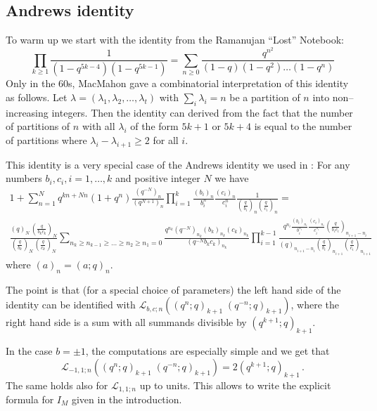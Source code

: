 \documentclass[12pt]{amsart}
\theoremstyle{plain}
\theoremstyle{definition}
\def\cL{\mathcal L}
\begin{document}
\subsection{Andrews identity}
To warm up
we start with the  identity from the Ramanujan ``Lost'' Notebook:
$$\prod_{k\geq 1}\frac{1}{(1-q^{5k-4})(1-q^{5k-1})}=\sum_{n\geq 0}
\frac{q^{n^2}}{(1-q)(1-q^2)\dots (1-q^n)} $$
Only in the
60s, MacMahon gave a combinatorial interpretation of this identity
as follows.
Let $\lambda=(\lambda_1, \lambda_2, \dots, \lambda_t)$ with
$\sum_i\lambda_i=n$ be a partition of $n$ into non--increasing integers.
Then the identity can derived from the fact that
the number of partitions of $n$ with all $\lambda_i$ of the
 form $5k+1$ or $5k+4$
is equal to the number of partitions where $\lambda_{i}-\lambda_{i+1}\geq 2$
for all $i$.

 This identity is a very special
case of the Andrews identity we used  in \cite{BBL}: For any numbers $b_i,c_i,
i=1,\dots,k$ and positive integer $N$ we have
\begin{multline*}  1+ \sum_{n =1}^N  q^{kn+Nn} (1+ q^n)  \frac{(q^{-N})_n}{(q^{N+1})_n} \prod_{i=1}^k
\frac{(b_i)_{n}}{b_i^{n}} \frac{(c_i)_{n}}{c_i^{n}}
\frac{1}{(\frac{q}{b_i})_n (\frac{q}{c_i})_n}=
\\
\frac{(q)_N\,  (\frac{q}{b_kc_k})_N}{(\frac{q}{b_k})_N\,
(\frac{q}{c_k})_N} \sum_{n_k \ge n_{k-1} \ge \dots \ge n_2 \ge n_1=0}
 \frac{q^{n_k} (q^{-N})_{n_k} (b_k)_{n_k}
(c_k)_{n_k}}{(q^{-N}b_kc_k)_{n_k}}\prod_{i=1}^{k-1}\frac{q^{n_i}
\frac{(b_i)_{n_i}}{b_i^{n_i}} \frac{(c_i)_{n_i}}{c_i^{n_i}}
(\frac{q}{b_i c_i})_{n_{i+1}-n_i} }{(q)_{n_{i+1}-n_i}
(\frac{q}{b_i})_{n_{i+1}}  (\frac{q}{c_i})_{n_{i+1}}} \label{1002}
\end{multline*}
where $(a)_n=(a;q)_n$.

The point is that (for a special choice of parameters)
the left hand side of the identity
 can be identified with
$\cL_{b,c;n}\left((q^{n};q)_{k+1}\; (q^{-n};q)_{k+1}\right)$, where
 the right hand side is a sum with all summands
divisible by $(q^{k+1};q)_{k+1}$.

In the case $b=\pm 1$, the computations are especially simple and we get
that
$$\cL_{-1,1;n}((q^{n};q)_{k+1}\; (q^{-n};q)_{k+1})=2(q^{k+1};q)_{k+1}\, .$$
The same holds also for $\cL_{1,1;n}$ up to units.
This allows to write the explicit formula for $I_M$ given in the introduction.
\end{document}
